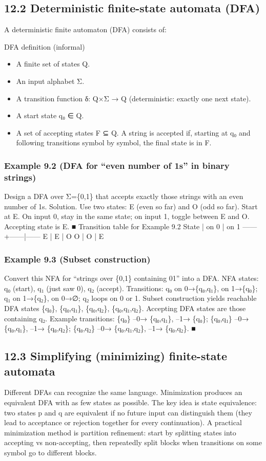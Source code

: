 \documentclass[11pt]{article}
\begin{document}
\subsection{12.2 Deterministic finite-state automata (DFA)}
A deterministic finite automaton (DFA) consists of:

DFA definition (informal)
\begin{itemize}[leftmargin=*,itemsep=0.25em]
\item A finite set of states Q.
\item An input alphabet Σ.
\item A transition function δ: Q×Σ → Q (deterministic: exactly one next state).
\item A start state q₀ ∈ Q.
\item A set of accepting states F ⊆ Q. A string is accepted if, starting at q₀ and following transitions symbol by symbol, the final state is in F.
\end{itemize}
\subsubsection*{Example 9.2 (DFA for “even number of 1s” in binary strings)}
Design a DFA over Σ=\{0,1\} that accepts exactly those strings with an even
number of 1s.
Solution. Use two states: E (even so far) and O (odd so far). Start at E. On input 0,
stay in the same state; on input 1, toggle between E and O. Accepting state is E. ■
Transition table for Example 9.2
State | on 0 | on 1
------+------|------
  E   |  E   |  O
  O   |  O   |  E
\subsubsection*{Example 9.3 (Subset construction)}
Convert this NFA for “strings over \{0,1\} containing 01” into a DFA.
NFA states: q₀ (start), q₁ (just saw 0), q₂ (accept). Transitions:
q₀ on 0→\{q₀,q₁\}, on 1→\{q₀\}; q₁ on 1→\{q₂\}, on 0→∅; q₂ loops on 0 or 1.
Subset construction yields reachable DFA states
\{q₀\}, \{q₀,q₁\}, \{q₀,q₂\}, \{q₀,q₁,q₂\}.
Accepting DFA states are those containing q₂. Example transitions:
\{q₀\} --0→ \{q₀,q₁\}, --1→ \{q₀\};
\{q₀,q₁\} --0→ \{q₀,q₁\}, --1→ \{q₀,q₂\};
\{q₀,q₂\} --0→ \{q₀,q₁,q₂\}, --1→ \{q₀,q₂\}. ■
\subsection{12.3 Simplifying (minimizing) finite-state automata}
Different DFAs can recognize the same language. Minimization produces an equivalent
DFA with as few states as possible. The key idea is state equivalence: two states p and q
are equivalent if no future input can distinguish them (they lead to acceptance or rejection
together for every continuation).
A practical minimization method is partition refinement: start by splitting states into
accepting vs non-accepting, then repeatedly split blocks when transitions on some symbol
go to different blocks.
\end{document}
